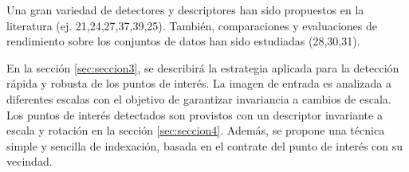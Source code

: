   Una gran variedad de detectores y descriptores han sido propuestos en la literatura (ej. 21,24,27,37,39,25).
  También, comparaciones y evaluaciones de rendimiento sobre los conjuntos de datos han sido estudiadas (28,30,31).


  En la sección \ref{sec:seccion3}, se describirá la estrategia aplicada para la detección rápida y robusta de los puntos de interés. La imagen de entrada es analizada a diferentes escalas con el objetivo de garantizar invariancia a cambios de escala. Los puntos de interés detectados son provistos con un descriptor invariante a escala y rotación en la sección \ref{sec:seccion4}. Además, se propone una técnica simple y sencilla de indexación, basada en el contrate del punto de interés con su vecindad.

